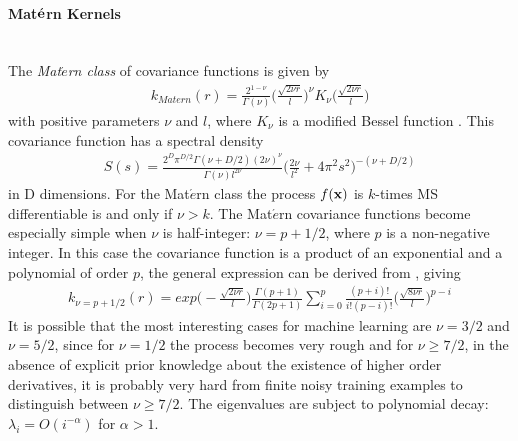 \documentclass[11pt]{article}
\begin{document}
\paragraph{Mat$\acute{{\bf e}}$rn Kernels}\mbox{}\\
The \textsl{Mat$\acute{e}$rn class} of covariance functions is given by
\begin{align*}
k_{Matern}(r)=\frac{2^{1-\nu}}{\Gamma(\nu)}\Big(\frac{\sqrt{2\nu r}}{l}\Big)^\nu K_\nu \Big(\frac{\sqrt{2\nu r}}{l}\Big)
\end{align*}
with positive parameters $\nu$ and $l$, where $K_\nu$ is a modified Bessel function \citep{abramowitz_handbook_1974}. This covariance function has a spectral density
\begin{align*}
S(s)=\frac{2^D\pi^{D/2}\Gamma(\nu+D/2)(2\nu)^\nu}{\Gamma(\nu)l^{2\nu}}\Big(\frac{2\nu}{l^2}+4\pi^2s^2\Big)^{-(\nu+D/2)}
\end{align*}
in D dimensions. For the Mat$\acute{e}$rn class the process $f({\bf x})$ is $k$-times MS differentiable is and only if $\nu>k$. The Mat$\acute{e}$rn covariance functions become especially simple when $\nu$ is half-integer: $\nu=p+1/2$, where $p$ is a non-negative integer. In this case the covariance function is a product of an exponential and a polynomial of order $p$, the general expression can be derived from \citep{abramowitz_handbook_1974}, giving
\begin{align*}
k_{\nu=p+1/2}(r)=exp\Big(-\frac{\sqrt{2\nu r}}{l}\Big)\frac{\Gamma(p+1)}{\Gamma(2p+1)}\sum_{i=0}^p \frac{(p+i)!}{i!(p-i)!}\Big(\frac{\sqrt{8\nu r}}{l}\Big)^{p-i}
\end{align*}
It is possible that the most interesting cases for machine learning are $\nu=3/2$ and $\nu=5/2$, since for $\nu=1/2$ the process becomes very rough and for $\nu \geq 7/2$, in the absence of explicit prior knowledge about the existence of higher order derivatives, it is probably very hard from finite noisy training examples to distinguish between $\nu \geq 7/2$. The eigenvalues are subject to polynomial decay: $\lambda_i=O(i^{-\alpha})$ for $\alpha>1$.
\end{document}
